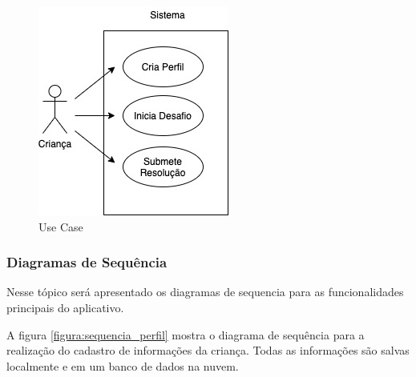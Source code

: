         \begin{figure}[H]
            \caption{Use Case}
            \begin{center}
                \includegraphics[width=\linewidth]{Imagens/cap3/Use Case.jpg}
            \end{center}
            \label{figura:use_case}
        \end{figure}
        
        \subsubsection{Diagramas de Sequência}
        
        Nesse tópico será apresentado os diagramas de sequencia para as funcionalidades principais do aplicativo.
        
        
        A figura \ref{figura:sequencia_perfil} mostra o diagrama de sequência para a realização do cadastro de informações da criança. Todas as informações são salvas localmente e em um banco de dados na nuvem.
        
